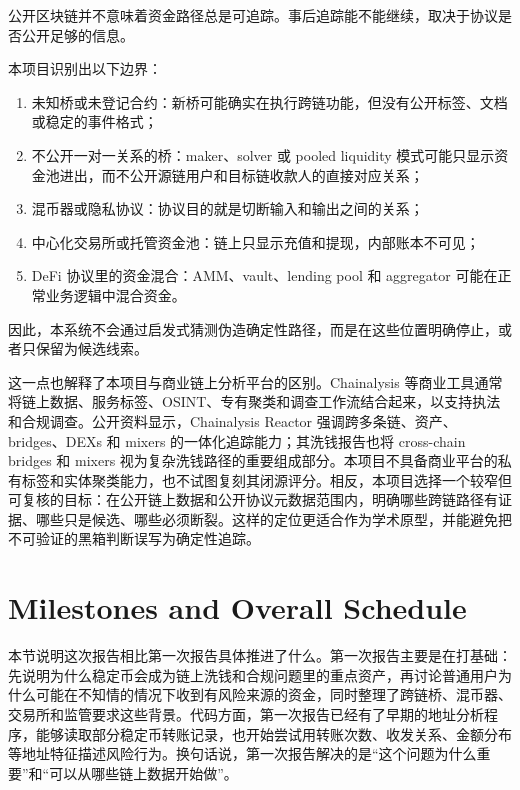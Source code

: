 \documentclass[12pt,a4paper]{ctexart}
\providecommand{\tightlist}{\setlength{\itemsep}{0pt}\setlength{\parskip}{0pt}}
\begin{document}
公开区块链并不意味着资金路径总是可追踪。事后追踪能不能继续，取决于协议是否公开足够的信息。

本项目识别出以下边界：

\begin{enumerate}
\def\labelenumi{\arabic{enumi}.}
\tightlist
\item
  未知桥或未登记合约：新桥可能确实在执行跨链功能，但没有公开标签、文档或稳定的事件格式；
\item
  不公开一对一关系的桥：maker、solver 或 pooled liquidity 模式可能只显示资金池进出，而不公开源链用户和目标链收款人的直接对应关系；
\item
  混币器或隐私协议：协议目的就是切断输入和输出之间的关系；
\item
  中心化交易所或托管资金池：链上只显示充值和提现，内部账本不可见；
\item
  DeFi 协议里的资金混合：AMM、vault、lending pool 和 aggregator
  可能在正常业务逻辑中混合资金。
\end{enumerate}

因此，本系统不会通过启发式猜测伪造确定性路径，而是在这些位置明确停止，或者只保留为候选线索。

这一点也解释了本项目与商业链上分析平台的区别。Chainalysis
等商业工具通常将链上数据、服务标签、OSINT、专有聚类和调查工作流结合起来，以支持执法和合规调查。公开资料显示，Chainalysis
Reactor 强调跨多条链、资产、bridges、DEXs 和 mixers
的一体化追踪能力；其洗钱报告也将 cross-chain bridges 和 mixers
视为复杂洗钱路径的重要组成部分。本项目不具备商业平台的私有标签和实体聚类能力，也不试图复刻其闭源评分。相反，本项目选择一个较窄但可复核的目标：在公开链上数据和公开协议元数据范围内，明确哪些跨链路径有证据、哪些只是候选、哪些必须断裂。这样的定位更适合作为学术原型，并能避免把不可验证的黑箱判断误写为确定性追踪。

\hypertarget{milestones-and-overall-schedule}{%
\section{Milestones and Overall
Schedule}\label{milestones-and-overall-schedule}}

本节说明这次报告相比第一次报告具体推进了什么。第一次报告主要是在打基础：先说明为什么稳定币会成为链上洗钱和合规问题里的重点资产，再讨论普通用户为什么可能在不知情的情况下收到有风险来源的资金，同时整理了跨链桥、混币器、交易所和监管要求这些背景。代码方面，第一次报告已经有了早期的地址分析程序，能够读取部分稳定币转账记录，也开始尝试用转账次数、收发关系、金额分布等地址特征描述风险行为。换句话说，第一次报告解决的是“这个问题为什么重要”和“可以从哪些链上数据开始做”。
\end{document}

